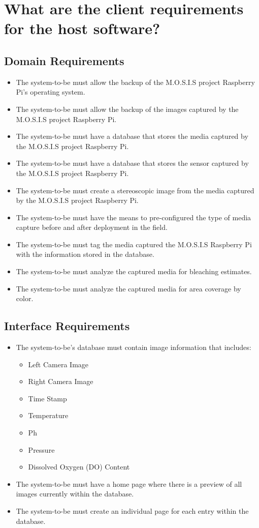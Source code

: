 \documentclass[12pt]{article}
\begin{document}
\section{What are the client requirements for the host software?}
\subsection{Domain Requirements}
\begin{itemize}
	\item The system-to-be must allow the backup of the M.O.S.I.S project Raspberry Pi's operating system.
	\item The system-to-be must allow the backup of the images captured by the M.O.S.I.S project Raspberry Pi.
	\item The system-to-be must have a database that stores the media captured by the M.O.S.I.S project Raspberry Pi.
	\item The system-to-be must have a database that stores the sensor captured by the M.O.S.I.S project Raspberry Pi.
	\item The system-to-be must create a stereoscopic image from the media captured by the M.O.S.I.S project Raspberry Pi.
	\item The system-to-be must have the means to pre-configured the type of media capture before and after deployment in the field.
	\item The system-to-be must tag the media captured the M.O.S.I.S Raspberry Pi with the information stored in the database.
	\item The system-to-be must analyze the captured media for bleaching estimates.
	\item The system-to-be must analyze the captured media for area coverage by color.
\end{itemize}
\subsection{Interface Requirements}
\begin{itemize}
	\item The system-to-be's database must contain image information that includes:
	      \begin{itemize}
		      \item Left Camera Image
		      \item Right Camera Image
		      \item Time Stamp
		      \item Temperature
		      \item Ph
		      \item Pressure
		      \item Dissolved Oxygen (DO) Content
	      \end{itemize}
	\item The system-to-be must have a home page where there is a preview of all images currently within the database.
	\item The system-to-be must create an individual page for each entry within the database.
\end{itemize}
\end{document}
